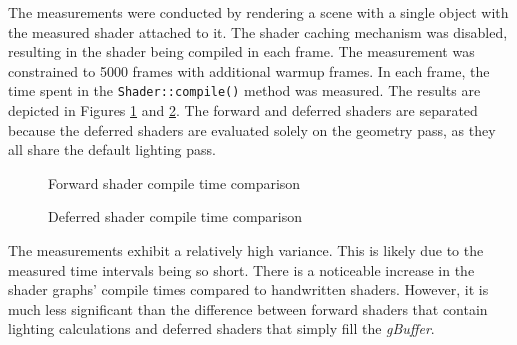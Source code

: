 \documentclass[
  digital,     %
  oneside,     %
  nosansbold,  %
  nocolorbold, %
  lof,         %
  lot,         %
]{fithesis4}
\begin{document}
The measurements were conducted by rendering a scene with a single object with the measured shader
attached to it. The shader caching mechanism was disabled, resulting in the shader being compiled in each frame.
The measurement was constrained to 5000 frames with additional warmup frames. In each frame,
the time spent in the \verb|Shader::compile()| method was measured.
The results are depicted in Figures \ref{fig:compile-forward} and \ref{fig:compile-deferred}.
The forward and deferred shaders are separated because the deferred shaders are evaluated solely
on the geometry pass, as they all share the default lighting pass.
\begin{figure}[H]
  \centering
  \caption{Forward shader compile time comparison}
  \label{fig:compile-forward}
\end{figure}
\begin{figure}[H]
  \centering
  \caption{Deferred shader compile time comparison}
  \label{fig:compile-deferred}
\end{figure}

The measurements exhibit a relatively high variance. This is likely due to the measured time intervals being so short.
There is a noticeable increase in the shader graphs' compile times compared to handwritten shaders.
However, it is much less significant than the difference between forward shaders that contain lighting calculations
and deferred shaders that simply fill the \emph{gBuffer}.
\end{document}
